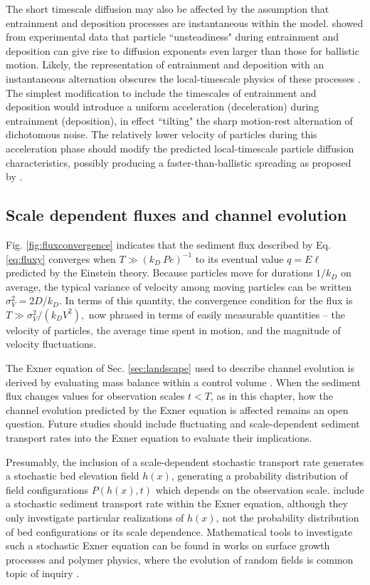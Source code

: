 The short timescale diffusion may also be affected by the assumption that entrainment and deposition processes are instantaneous within the model.
\citet{Campagnol2015} showed from experimental data that particle ``unsteadiness" during entrainment and deposition can give rise to diffusion exponents even larger than those for ballistic motion.
Likely, the representation of entrainment and deposition with an instantaneous alternation obscures the local-timescale physics of these processes \citep[e.g.][]{Valyrakis2010,Celik2014}.
The simplest modification to include the timescales of entrainment and deposition would introduce a uniform acceleration (deceleration) during entrainment (deposition), in effect ``tilting" the sharp motion-rest alternation of dichotomous noise. The relatively lower velocity of particles during this acceleration phase should modify the predicted local-timescale particle diffusion characteristics, possibly producing a faster-than-ballistic spreading as proposed by \citet{Campagnol2015}.

\subsection{Scale dependent fluxes and channel evolution}

Fig. \ref{fig:fluxconvergence} indicates that the sediment flux described by Eq. \ref{eq:fluxy} converges when $T\gg (k_D\ Pe)^{-1}$ to its eventual value $q = E\ell$ predicted by the Einstein theory.
Because particles move for durations $1/k_D$ on average, the typical variance of velocity among moving particles can be written $\sigma_V^2 = 2D/k_D$. In terms of this quantity, the convergence condition for the flux is  $T\gg \sigma_V^2/(k_D V^2),$ now phrased in terms of easily measurable quantities -- the velocity of particles, the average time spent in motion, and the magnitude of velocity fluctuations.

The Exner equation of Sec. \ref{sec:landscape} used to describe channel evolution is derived by evaluating mass balance within a control volume \citep[e.g.][]{Coleman2009}. When the sediment flux changes values for observation scales $t < T$, as in this chapter, how the channel evolution predicted by the Exner equation is affected remains an open question. Future studies should include fluctuating and scale-dependent sediment transport rates into the Exner equation to evaluate their implications.

Presumably, the inclusion of a scale-dependent stochastic transport rate generates a stochastic bed elevation field $h(x)$, generating a probability distribution of field configurations $P(h(x),t)$ which depends on the observation scale.
\citet{Jerolmack2005} include a stochastic sediment transport rate within the Exner equation, although they only investigate particular realizations of $h(x)$, not the probability distribution of bed configurations or its scale dependence.
Mathematical tools to investigate such a stochastic Exner equation can be found in works on surface growth processes and polymer physics, where the evolution of random fields is common topic of inquiry \citep[e.g.][]{Kawakatsu2001,Barabasi1995, Kardar2007}.

